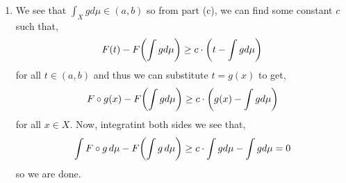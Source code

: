 \documentclass[12pt,a4paper]{article}
\begin{document}
\begin{solution}
\begin{enumerate}[label=\alph*.]
        The conclusion follows just as we did in part (b), we show part of it. 
        \[
            F'(t_0+)=\lim_{h\searrow 0}\frac{F(t_0+h)-F(t_0)}{h}\leq\frac{F(y)-F(t_0)}{y-t_0}
        \]
        for any $y>t_0$ as $t_0+h<y$ eventually. 
    \item We see that $\int_Xgd\mu\in(a,b)$ so from part (c), we can find some constant $c$ such that,
        \[
            F(t)-F\qty(\int gd\mu)\geq c\cdot\qty(t-\int gd\mu)
        \]
        for all $t\in(a,b)$ and thus we can substitute $t=g(x)$ to get,
        \[
            F\circ g(x)-F\qty(\int gd\mu)\geq c\cdot\qty(g(x)-\int gd\mu)
        \]
        for all $x\in X.$ 
        Now, integratint both sides we see that,
        \[
            \int F\circ g\,d\mu-F\qty(\int g\,d\mu)\geq c\cdot\int gd\mu-\int gd\mu=0
        \]
        so we are done.
\end{enumerate}
\end{solution}
\end{document}
